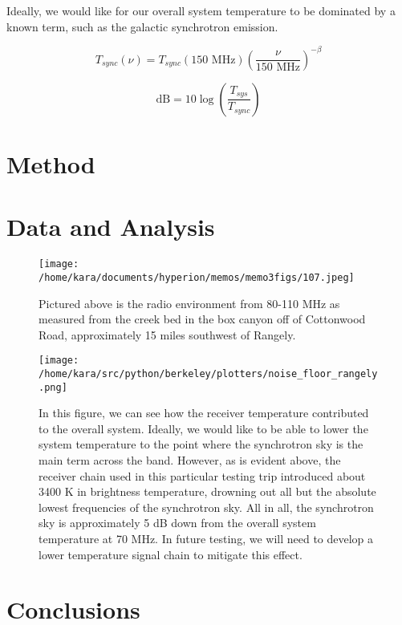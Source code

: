\documentclass[11pt]{article}
\begin{document}
Ideally, we would like for our overall system temperature to be dominated by a 
known term, such as the galactic synchrotron emission.  

\begin{equation}
    \label{eq:sync-temp}
    T_{sync}(\nu) = T_{sync}(\textrm{150 MHz}) \left(\frac{\nu}{\textrm{150 
    MHz}}\right)^{-\beta}
\end{equation}

\begin{equation}
    \label{eq:dB-to-sky}
    \textrm{dB} = 10 \log\left(\frac{T_{sys}}{T_{sync}}\right)
\end{equation}


\section{Method}


\section{Data and Analysis}

\begin{figure}
    \begin{center}
    \texttt{[image: /home/kara/documents/hyperion/memos/memo3figs/107.jpeg]}
    \end{center}
    \caption{
        Pictured above is the radio environment from 80-110 MHz as measured 
        from the creek bed in the box canyon off of Cottonwood Road, 
        approximately 15 miles southwest of Rangely.
    }
    \label{fig:107}
\end{figure}

\begin{figure}
    \begin{center}
    \texttt{[image: /home/kara/src/python/berkeley/plotters/noise\_floor\_rangely.png]}
    \end{center}
    \caption{
        In this figure, we can see how the receiver temperature contributed to 
        the overall system. Ideally, we would like to be able to lower the 
        system temperature to the point where the synchrotron sky is the main 
        term across the band. However, as is evident above, the receiver chain 
        used in this particular testing trip introduced about 3400 K in 
        brightness temperature, drowning out all but the absolute lowest 
        frequencies of the synchrotron sky. All in all, the synchrotron sky is 
        approximately 5 dB down from the overall system temperature at 70 MHz. 
        In future testing, we will need to develop a lower temperature signal 
        chain to mitigate this effect.
    }
    \label{fig:noise-floor}
\end{figure}

\section{Conclusions}


{}

\end{document}
